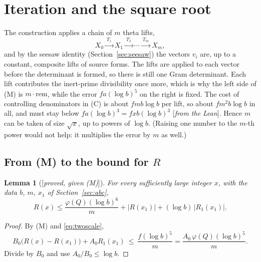 \documentclass[11pt]{amsart}
\numberwithin{equation}{section}
\newtheorem{lemma}[theorem]{Lemma}
\theoremstyle{definition}
\theoremstyle{remark}
\newcommand{\status}[1]{\textup{[\emph{#1}]}}
\begin{document}
\section{Iteration and the square root}\label{sec:sqrt}

The construction applies a chain of $m$ theta lifts,
\begin{equation}
 X_0\xrightarrow{\ T_1\ }X_1\xrightarrow{\ T_2\ }\cdots\xrightarrow{\ T_m\ }X_m,
\end{equation}
and by the seesaw identity (Section~\ref{sec:seesaw}) the vectors $v_i$ are, up to a constant, composite lifts of source forms. The lifts are applied to each vector before the determinant is formed, so there is still one Gram determinant. Each lift contributes the inert-prime divisibility once more, which is why the left side of (M) is $m\cdot\mathrm{rem}$, while the error $fa(\log b)^5$ on the right is fixed. The cost of controlling denominators in (C) is about $fmb\log b$ per lift, so about $fm^2b\log b$ in all, and must stay below $fa(\log b)^3=fxb(\log b)^3$ \status{from the Lean}. Hence $m$ can be taken of size $\sqrt x$, up to powers of $\log b$. (Raising one number to the $m$-th power would not help: it multiplies the error by $m$ as well.)

\subsection*{From (M) to the bound for $R$}

\begin{lemma}[\status{proved, given (M)}]\label{lem:divide}
For every sufficiently large integer $x$, with the data $b$, $m$, $x_1$ of Section~\ref{sec:abc},
\begin{equation}
 R(x)\le\frac{\varphi(Q)(\log b)^6}{m}+|R(x_1)|+(\log b)\,|R_1(x_1)|.
\end{equation}
\end{lemma}
\begin{proof}
By (M) and \eqref{eq:twoscale},
\begin{equation}
 B_0\bigl(R(x)-R(x_1)\bigr)+A_0R_1(x_1)\ \le\ \frac{f(\log b)^5}{m}=\frac{A_0\,\varphi(Q)(\log b)^5}{m}.
\end{equation}
Divide by $B_0$ and use $A_0/B_0\le\log b$.
\end{proof}
\end{document}

